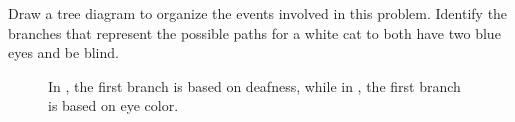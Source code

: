 \begin{example}{Draw a tree diagram to organize the events involved in this problem. Identify the branches that represent the possible paths for a white cat to both have two blue eyes and be blind. }
\begin{figure}[h!]
\centering
{}
\caption{In , the first branch is based on deafness, while in , the first branch is based on eye color. }
\label{catGeneticsTrees}
\end{figure}	

\end{example}

